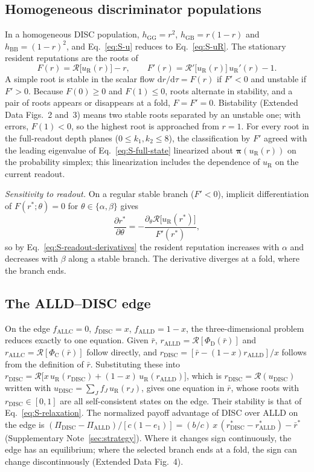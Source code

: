\documentclass[fleqn,10pt]{article}
\theoremstyle{plain}
\theoremstyle{remark}
\newcommand{\EDResident}{2}
\newcommand{\EDPlanes}{3}
\newcommand{\EDEdge}{4}
\newcommand{\Rm}{\mathcal R}
\newcommand{\G}{\mathrm G}
\newcommand{\B}{\mathrm B}
\newcommand{\C}{\mathrm C}
\newcommand{\D}{\mathrm D}
\newcommand{\ALLC}{\mathrm{ALLC}}
\newcommand{\ALLD}{\mathrm{ALLD}}
\newcommand{\DISC}{\mathrm{DISC}}
\begin{document}
\subsection{Homogeneous discriminator populations}
\label{sec:homogeneous}
In a homogeneous DISC population, $h_{\G\G}=r^2$, $h_{\G\B}=r(1-r)$ and
$h_{\B\B}=(1-r)^2$, and Eq.~\eqref{eq:S-u} reduces to Eq.~\eqref{eq:S-uR}. The
stationary resident reputations are the roots of
\begin{equation}
F(r)=\Rm\bigl[u_{\mathrm R}(r)\bigr]-r,\qquad
F'(r)=\Rm'\bigl[u_{\mathrm R}(r)\bigr]\,u_{\mathrm R}'(r)-1 .
\label{eq:S-F}
\end{equation}
A simple root is stable in the scalar flow $\mathrm dr/\mathrm d\tau=F(r)$ if
$F'<0$ and unstable if $F'>0$. Because $F(0)\ge0$ and $F(1)\le0$, roots
alternate in stability, and a pair of roots appears or disappears at a fold,
$F=F'=0$. Bistability (Extended Data Figs.~\EDResident{} and~\EDPlanes) means
two stable roots separated by an unstable one; with errors, $F(1)<0$, so the
highest root is approached from $r=1$. For every root in the full-readout depth
planes ($0\le k_1,k_2\le8$), the classification by $F'$ agreed with the leading
eigenvalue of Eq.~\eqref{eq:S-full-state} linearized about
$\boldsymbol\pi(u_{\mathrm R}(r))$ on the probability simplex; this linearization
includes the dependence of $u_{\mathrm R}$ on the current readout.

\emph{Sensitivity to readout.} On a regular stable branch ($F'<0$), implicit
differentiation of $F(r^*;\theta)=0$ for $\theta\in\{\alpha,\beta\}$ gives
\begin{equation}
\frac{\partial r^*}{\partial\theta}=-\frac{\partial_\theta\Rm\bigl[u_{\mathrm R}(r^*)\bigr]}{F'(r^*)},
\label{eq:S-branch-sensitivity}
\end{equation}
so by Eq.~\eqref{eq:S-readout-derivatives} the resident reputation increases
with $\alpha$ and decreases with $\beta$ along a stable branch. The derivative
diverges at a fold, where the branch ends.

\subsection{The ALLD--DISC edge}
\label{sec:edge}
On the edge $f_{\ALLC}=0$, $f_{\DISC}=x$, $f_{\ALLD}=1-x$, the three-dimensional
problem reduces exactly to one equation. Given $\bar r$,
$r_{\ALLD}=\Rm[\Phi_\D(\bar r)]$ and $r_{\ALLC}=\Rm[\Phi_\C(\bar r)]$ follow
directly, and $r_{\DISC}=[\bar r-(1-x)r_{\ALLD}]/x$ follows from the definition of
$\bar r$. Substituting these into
$r_{\DISC}=\Rm\bigl[x\,u_{\mathrm R}(r_{\DISC})+(1-x)\,u_{\mathrm R}(r_{\ALLD})\bigr]$,
which is $r_{\DISC}=\Rm(u_{\DISC})$ written with $u_{\DISC}=\sum_Jf_J\,u_{\mathrm R}(r_J)$,
gives one equation in $\bar r$,
whose roots with $r_{\DISC}\in[0,1]$ are all self-consistent states on the edge.
Their stability is that of Eq.~\eqref{eq:S-relaxation}. The normalized payoff
advantage of DISC over ALLD on the edge is
$(\Pi_{\DISC}-\Pi_{\ALLD})/[c(1-e_1)]=(b/c)\,x\,(r^*_{\DISC}-r^*_{\ALLD})-\bar r^*$
(Supplementary Note~\ref{sec:strategy}). Where it changes sign continuously, the
edge has an equilibrium; where the selected branch ends at a fold, the sign can
change discontinuously (Extended Data Fig.~\EDEdge).
\end{document}
